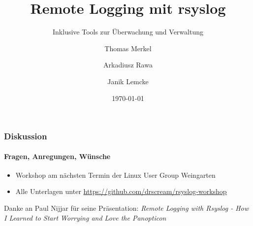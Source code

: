 \documentclass[10pt,a4paper]{beamer}
\title{Remote Logging mit rsyslog}
\subtitle{Inklusive Tools zur Überwachung und Verwaltung}
\author{Thomas Merkel \and Arkadiusz Rawa \and Janik Lemcke}
\institute{Hochschule Ravensburg-Weingarten}
\date{\today}
\begin{document}
	\begin{frame}
		\titlepage
	\end{frame} 
	\begin{frame}
		\tableofcontents
	\end{frame}
	
	
	
	
	

	\begin{frame}
		\frametitle{Diskussion}
		\framesubtitle{Fragen, Anregungen, Wünsche}
		\begin{itemize}
			\item Workshop am nächsten Termin der Linux User Group Weingarten
			\item Alle Unterlagen unter \url{https://github.com/drscream/rsyslog-workshop}		
		\end{itemize}
		\bigskip
		\bigskip
		\scriptsize{
			Danke an Paul Nijjar für seine Präsentation: \linebreak 
			\textit{Remote Logging with Rsyslog - How I Learned to Start Worrying and Love the Panopticon}
		}
	\end{frame}
\end{document}
